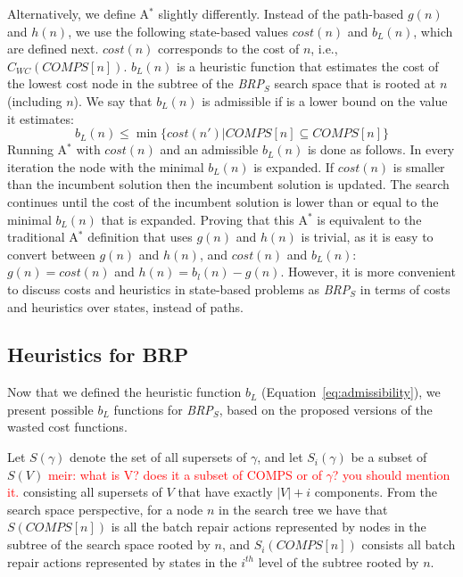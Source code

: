 \documentclass[a4paper,11pt]{report}
\newcommand\meir[1]{\textcolor{red}{meir: #1}}
\newcommand\roni[1]{\textcolor{green}{roni: #1}}
\newcommand{\astar}{A$^*$}
\newcommand{\brps}{\textit{BRP$_S$}}
\newcommand{\comps}{\textit{COMPS}}
\begin{document}
Alternatively, we define \astar{} slightly differently. 
Instead of the path-based $g(n)$ and $h(n)$, we use the following state-based values $cost(n)$ and $b_L(n)$, which are defined next.
$cost(n)$ corresponds to the cost of $n$, i.e., $C_{WC}(\comps[n])$. 
$b_L(n)$ is a heuristic function that estimates the cost of the lowest cost node in the subtree of the \brps{} search space that is rooted at $n$ (including $n$). 
We say that $b_L(n)$ is admissible if is a lower bound on the value it estimates: \begin{equation}
 b_L(n)\leq \min \{cost(n')| \comps[n]\subseteq \comps[n]\}  \label{eq:admissibility}
\end{equation}
Running \astar{} with $cost(n)$ and an admissible $b_L(n)$ is done as follows. In every iteration the node with the minimal $b_L(n)$ is expanded.
If $cost(n)$ is smaller than the incumbent solution then the incumbent solution is updated. The search continues until 
the cost of the incumbent solution is lower than or equal to the minimal $b_L(n)$ that is expanded. 
Proving that this \astar{} is equivalent to the traditional \astar{} definition that uses $g(n)$ and $h(n)$ is trivial, 
as it is easy to convert between $g(n)$ and $h(n)$, and $cost(n)$ and $b_L(n)$: 
$g(n)=cost(n)$ and $h(n)=b_l(n)-g(n)$. 
However, it is more convenient to discuss costs and heuristics in state-based problems as \brps{} in terms of costs and heuristics over states, instead of paths. 

\subsection{Heuristics for BRP}
Now that we defined the heuristic function $b_L$ (Equation~\ref{eq:admissibility}), 
we present possible $b_L$ functions for \brps{}, based on the proposed versions of the wasted cost functions. 

Let $S(\gamma)$ denote the set of all supersets of $\gamma$, and let $S_i(\gamma)$ be a subset of $S(V)$ \meir{what is V? does it a subset of COMPS or of $\gamma$? you should mention it.} consisting all supersets of $V$ that have exactly $|V|+i$  components. From the search space perspective, 
for a node $n$ in the search tree we have that $S(\comps[n])$ is all the batch repair actions represented by nodes in the subtree  of the search space rooted by $n$, and $S_i(\comps[n])$ consists all batch repair actions represented by states in the $i^{th}$ level of the subtree rooted by $n$. 
\end{document}
